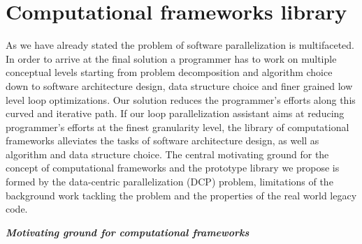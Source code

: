 \section{Computational frameworks library}
\label{introduction_frameworks}
\quad As we have already stated the problem of software parallelization is multifaceted. In order to arrive at the final solution a programmer has to work on multiple conceptual levels starting from problem decomposition and algorithm choice down to software architecture design, data structure choice and finer grained low level loop optimizations. Our solution reduces the programmer's efforts along this curved and iterative path. If our loop parallelization assistant aims at reducing programmer's efforts at the finest granularity level, the library of computational frameworks alleviates the tasks of software architecture design, as well as algorithm and data structure choice. The central motivating ground for the concept of computational frameworks and the prototype library we propose is formed by the data-centric parallelization (DCP) problem, limitations of the background work tackling the problem and the properties of the real world legacy code.
\begin{center}
\textbf{\large \textit{Motivating ground for computational frameworks}}
\end{center}
